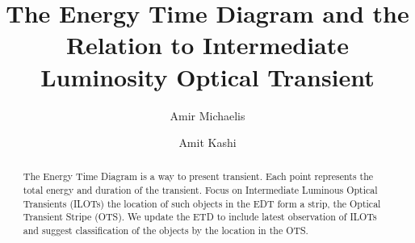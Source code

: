 \documentclass[modern]{aastex63}
\begin{document}
\title{The Energy Time Diagram and the Relation to Intermediate Luminosity Optical Transient}


\author[0000-0002-1361-9115]{Amir Michaelis}

\author[0000-0002-7840-0181]{Amit Kashi}

\begin{abstract}
The Energy Time Diagram is a way to present transient.
Each point represents the total energy and duration of the transient.
Focus on Intermediate Luminous Optical Transients (ILOTs) the location of such objects in the EDT form a strip, the Optical Transient Stripe (OTS).
We update the ETD to include latest observation of ILOTs and suggest classification of the objects by the location in the OTS.
\end{abstract}

\end{document}
